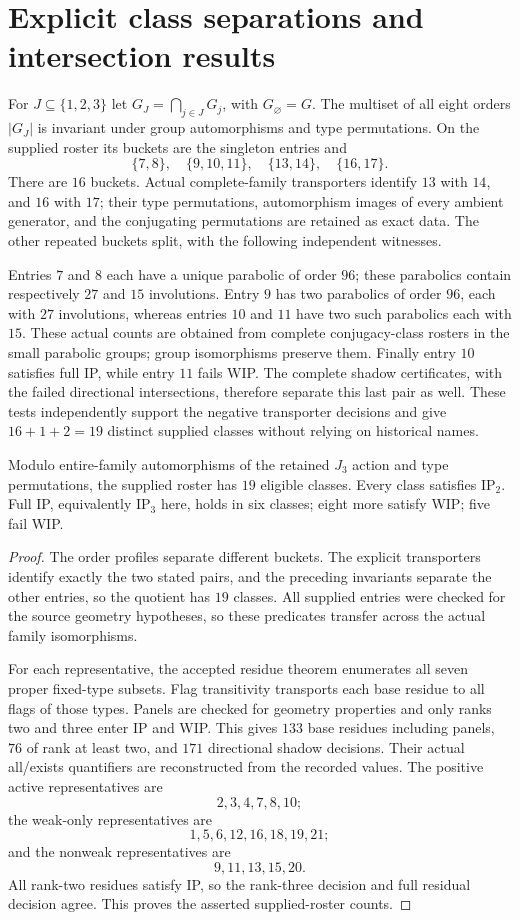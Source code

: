 \section{Explicit class separations and intersection results}
For $J\subseteq\{1,2,3\}$ let
$G_J=\bigcap_{j\in J}G_j$, with $G_\varnothing=G$.
The multiset of all eight orders $|G_J|$ is invariant under group
automorphisms and type permutations. On the supplied roster its buckets
are the singleton entries and
\[
 \{7,8\},\quad \{9,10,11\},\quad
 \{13,14\},\quad \{16,17\}.
\]
There are $16$ buckets. Actual complete-family transporters identify
$13$ with $14$, and $16$ with $17$; their type permutations,
automorphism images of every ambient generator, and the conjugating
permutations are retained as exact data. The other repeated buckets
split, with the following independent witnesses.

Entries $7$ and $8$ each have a unique parabolic of order $96$; these
parabolics contain respectively $27$ and $15$ involutions. Entry $9$ has
two parabolics of order $96$, each with $27$ involutions, whereas entries
$10$ and $11$ have two such parabolics each with $15$. These actual counts
are obtained from complete conjugacy-class rosters in the small
parabolic groups; group isomorphisms preserve them. Finally entry $10$
satisfies full IP, while entry $11$ fails WIP. The complete shadow
certificates, with the failed directional intersections, therefore
separate this last pair as well. These tests independently support the
negative transporter decisions and give $16+1+2=19$ distinct supplied
classes without relying on historical names.

\begin{proposition}
Modulo entire-family automorphisms of the retained $J_3$ action and type
permutations, the supplied roster has $19$ eligible classes. Every class
satisfies $\mathrm{IP}_2$. Full IP, equivalently $\mathrm{IP}_3$ here,
holds in six classes; eight more satisfy WIP; five fail WIP.
\end{proposition}
\begin{proof}
The order profiles separate different buckets. The explicit transporters
identify exactly the two stated pairs, and the preceding invariants
separate the other entries, so the quotient has $19$ classes. All supplied
entries were checked for the source geometry hypotheses, so these
predicates transfer across the actual family isomorphisms.

For each representative, the accepted residue theorem enumerates all
seven proper fixed-type subsets. Flag transitivity transports each base
residue to all flags of those types. Panels are checked for geometry
properties and only ranks two and three enter IP and WIP. This gives
$133$ base residues including panels, $76$ of rank at least two, and
$171$ directional shadow decisions. Their actual all/exists quantifiers
are reconstructed from the recorded values. The positive active
representatives are
\[
 2,3,4,7,8,10;
\]
the weak-only representatives are
\[
 1,5,6,12,16,18,19,21;
\]
and the nonweak representatives are
\[
 9,11,13,15,20.
\]
All rank-two residues satisfy IP, so the rank-three decision and full
residual decision agree. This proves the asserted supplied-roster counts.
\end{proof}

